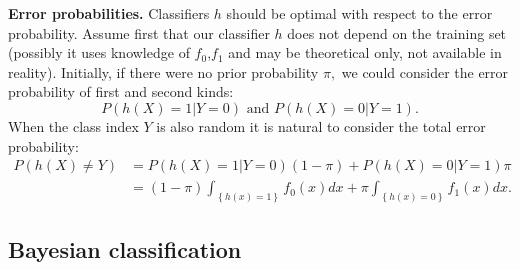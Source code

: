 \documentclass[11pt,twoside]{article}%
\theoremstyle{change}
\begin{document}
\textbf{Error probabilities. } Classifiers $h$ should be optimal with respect
to the error probability. Assume first that our classifier $h$ does not depend
on the training set (possibly it uses knowledge of $f_{0}$,$f_{1}$ and may be
theoretical only, not available in reality). Initially, if there were no prior
probability $\pi,$ we could consider the error probability of first and second
kinds:
\[
P\left(  h(X)=1|Y=0\right)  \text{ and }P\left(  h(X)=0|Y=1\right)  \text{.}%
\]
When the class index $Y$ is also random it is natural to consider the total
error probability:%
\begin{align}
P\left(  h(X)\neq Y\right)   & =P\left(  h(X)=1|Y=0\right)  \left(
1-\pi\right)  +P\left(  h(X)=0|Y=1\right)  \pi\label{err-probab}\\
& =\left(  1-\pi\right)  \int_{\left\{  h(x)=1\right\}  }f_{0}(x)dx+\pi
\int_{\left\{  h(x)=0\right\}  }f_{1}(x)dx.\nonumber
\end{align}


\subsection{Bayesian classification\label{sec:bayes-classif}}
\end{document}
